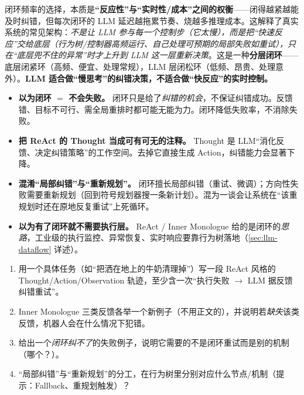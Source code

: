 \begin{insight}
闭环频率的选择，本质是\textbf{“反应性”与“实时性/成本”之间的权衡}——闭得越紧越能及时纠错，但每次闭环的 LLM 延迟越拖累节奏、烧越多推理成本。这解释了真实系统的常见架构：\emph{不是让 LLM 参与每一个控制步（它太慢），而是把“快速反应”交给底层（行为树/控制器高频运行、自己处理可预期的局部失败如重试），只在“底层兜不住的异常”时才上升到 LLM 这一层重新决策}。这是一种\textbf{分层闭环}——底层闭紧环（高频、便宜、处理常规），LLM 层闭松环（低频、昂贵、处理意外）。\textbf{LLM 适合做“慢思考”的纠错决策，不适合做“快反应”的实时控制。}
\end{insight}

\begin{pitfall}[本节常见陷阱]
\begin{itemize}
  \item \textbf{以为闭环 $=$ 不会失败。} 闭环只是给了\emph{纠错的机会}，不保证纠错成功。反馈错、目标不可行、需全局重排时都可能无能为力。闭环降低失败率，不消除失败。
  \item \textbf{把 ReAct 的 Thought 当成可有可无的注释。} Thought 是 LLM“消化反馈、决定纠错策略”的工作空间。去掉它直接生成 Action，纠错能力会显著下降。
  \item \textbf{混淆“局部纠错”与“重新规划”。} 闭环擅长局部纠错（重试、微调）；方向性失败需要重新规划（回到符号规划器搜一条新计划）。混为一谈会让系统在“该重规划时还在原地反复重试”上死循环。
  \item \textbf{以为有了闭环就不需要执行层。} ReAct / Inner Monologue 给的是闭环的\emph{思路}，工业级的执行监控、异常恢复、实时响应要靠行为树落地（\cref{sec:llm-dataflow} 详述）。
\end{itemize}
\end{pitfall}

\begin{exercise}
\begin{enumerate}
  \item 用一个具体任务（如“把洒在地上的牛奶清理掉”）写一段 ReAct 风格的 Thought/Action/Observation 轨迹，至少含一次“执行失败 $\to$ LLM 据反馈纠错重试”。
  \item Inner Monologue 三类反馈各举一个新例子（不用正文的），并说明若\emph{缺失}该类反馈，机器人会在什么情况下犯错。
  \item 给出一个\emph{闭环纠不了}的失败例子，说明它需要的不是闭环重试而是别的机制（哪个？）。
  \item “局部纠错”与“重新规划”的分工，在行为树里分别对应什么节点/机制（提示：Fallback、重规划触发）？
\end{enumerate}
\end{exercise}

